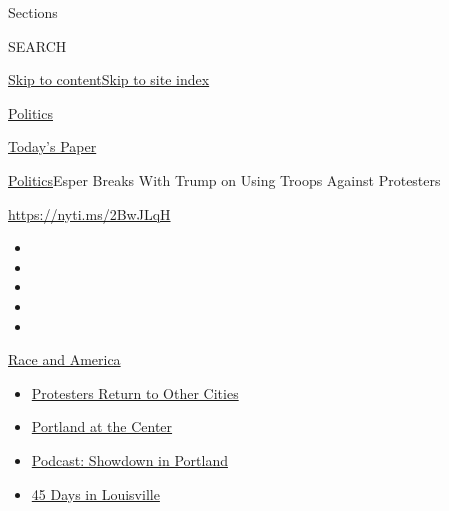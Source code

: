 Sections

SEARCH

\protect\hyperlink{site-content}{Skip to
content}\protect\hyperlink{site-index}{Skip to site index}

\href{https://www.nytimes.com/section/politics}{Politics}

\href{https://myaccount.nytimes.com/auth/login?response_type=cookie\&client_id=vi}{}

\href{https://www.nytimes.com/section/todayspaper}{Today's Paper}

\href{/section/politics}{Politics}\textbar{}Esper Breaks With Trump on
Using Troops Against Protesters

\url{https://nyti.ms/2BwJLqH}

\begin{itemize}
\item
\item
\item
\item
\item
\end{itemize}

\href{https://www.nytimes.com/news-event/george-floyd-protests-minneapolis-new-york-los-angeles?action=click\&pgtype=Article\&state=default\&region=TOP_BANNER\&context=storylines_menu}{Race
and America}

\begin{itemize}
\tightlist
\item
  \href{https://www.nytimes.com/2020/07/26/us/protests-portland-seattle-trump.html?action=click\&pgtype=Article\&state=default\&region=TOP_BANNER\&context=storylines_menu}{Protesters
  Return to Other Cities}
\item
  \href{https://www.nytimes.com/2020/07/24/us/portland-oregon-protests-white-race.html?action=click\&pgtype=Article\&state=default\&region=TOP_BANNER\&context=storylines_menu}{Portland
  at the Center}
\item
  \href{https://www.nytimes.com/2020/07/23/podcasts/the-daily/portland-protests.html?action=click\&pgtype=Article\&state=default\&region=TOP_BANNER\&context=storylines_menu}{Podcast:
  Showdown in Portland}
\item
  \href{https://www.nytimes.com/interactive/2020/07/16/us/black-lives-matter-protests-louisville-breonna-taylor.html?action=click\&pgtype=Article\&state=default\&region=TOP_BANNER\&context=storylines_menu}{45
  Days in Louisville}
\end{itemize}

